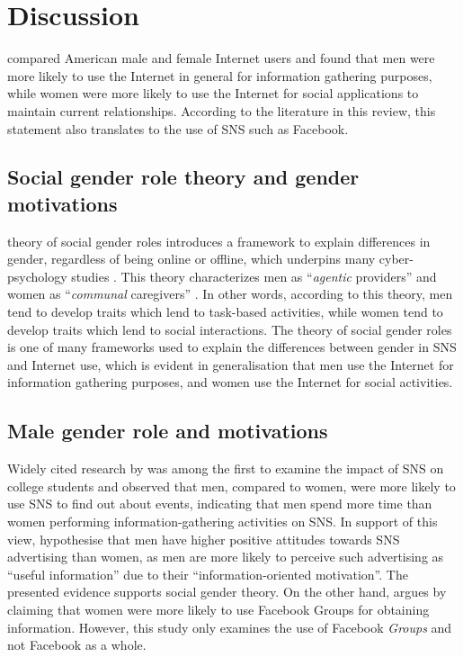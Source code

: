\section{Discussion}

\citet{Fallows2005} compared American male and female Internet users and found that men were more likely to use the Internet in general for information gathering purposes, while women were more likely to use the Internet for social applications to maintain current relationships. According to the literature in this review, this statement also translates to the use of SNS such as Facebook.

\subsection{Social gender role theory and gender motivations}

 theory of social gender roles introduces a framework to explain differences in gender, regardless of being online or offline, which underpins many cyber-psychology studies \citep{Hum2011, Tifferet2014, Kimbrough2013}. This theory characterizes men as ``\emph{agentic} providers'' and women as ``\emph{communal} caregivers'' \citep[p. 1830]{Hum2011}. In other words, according to this theory, men tend to develop traits which lend to task-based activities, while women tend to develop traits which lend to social interactions. The theory of social gender roles is one of many frameworks used to explain the differences between gender in SNS and Internet use, which is evident in  generalisation that men use the Internet for information gathering purposes, and women use the Internet for social activities.

\subsection{Male gender role and motivations}

Widely cited research by \citet{Raacke2008} was among the first to examine the impact of SNS on college students and observed that men, compared to women, were more likely to use SNS to find out about events, indicating that men spend more time than women performing information-gathering activities on SNS. In support of this view, \citet[p. 2]{Choi2014} hypothesise that men have higher positive attitudes towards SNS advertising than women, as men are more likely to perceive such advertising as ``useful information'' due to their ``information-oriented motivation''. The presented evidence supports  social gender theory. On the other hand, \citet{Park2009} argues by claiming that women were more likely to use Facebook Groups for obtaining information. However, this study only examines the use of Facebook \emph{Groups} and not Facebook as a whole. 

